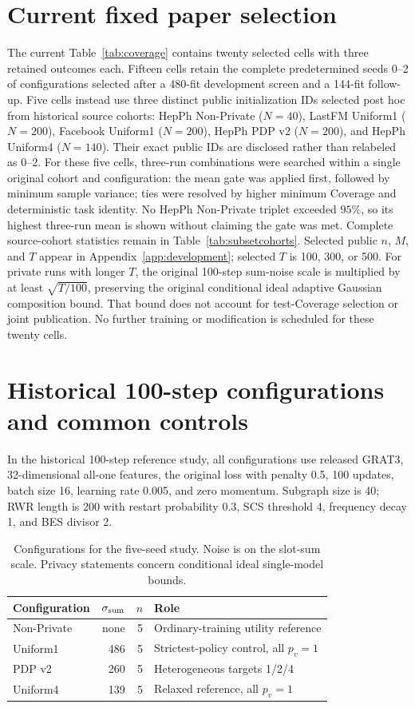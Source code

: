 \section{Current fixed paper selection}
The current Table~\ref{tab:coverage} contains twenty selected cells with three retained outcomes each. Fifteen cells retain the complete predetermined seeds 0--2 of configurations selected after a 480-fit development screen and a 144-fit follow-up. Five cells instead use three distinct public initialization IDs selected post hoc from historical source cohorts: HepPh Non-Private ($N=40$), LastFM Uniform1 ($N=200$), Facebook Uniform1 ($N=200$), HepPh PDP v2 ($N=200$), and HepPh Uniform4 ($N=140$). Their exact public IDs are disclosed rather than relabeled as 0--2. For these five cells, three-run combinations were searched within a single original cohort and configuration: the mean gate was applied first, followed by minimum sample variance; ties were resolved by higher minimum Coverage and deterministic task identity. No HepPh Non-Private triplet exceeded $95\%$, so its highest three-run mean is shown without claiming the gate was met. Complete source-cohort statistics remain in Table~\ref{tab:subsetcohorts}. Selected public $n$, $M$, and $T$ appear in Appendix~\ref{app:development}; selected $T$ is 100, 300, or 500. For private runs with longer $T$, the original 100-step sum-noise scale is multiplied by at least $\sqrt{T/100}$, preserving the original conditional ideal adaptive Gaussian composition bound. That bound does not account for test-Coverage selection or joint publication. No further training or modification is scheduled for these twenty cells.

\section{Historical 100-step configurations and common controls}
In the historical 100-step reference study, all configurations use released GRAT3, 32-dimensional all-one features, the original loss with penalty 0.5, 100 updates, batch size 16, learning rate 0.005, and zero momentum. Subgraph size is 40; RWR length is 200 with restart probability 0.3, SCS threshold 4, frequency decay 1, and BES divisor 2.

\begin{table}[htbp]
\centering\small
\caption{Configurations for the five-seed study. Noise is on the slot-sum scale. Privacy statements concern conditional ideal single-model bounds.}\label{tab:config}
\begin{tabular}{lrrp{64mm}}\toprule
Configuration & $\sigma_{\rm sum}$ & $n$ & Role\\\midrule
Non-Private & none & 5 & Ordinary-training utility reference\\
Uniform1 & 486 & 5 & Strictest-policy control, all $p_v=1$\\
PDP v2 & 260 & 5 & Heterogeneous targets 1/2/4\\
Uniform4 & 139 & 5 & Relaxed reference, all $p_v=1$\\\bottomrule
\end{tabular}
\end{table}

